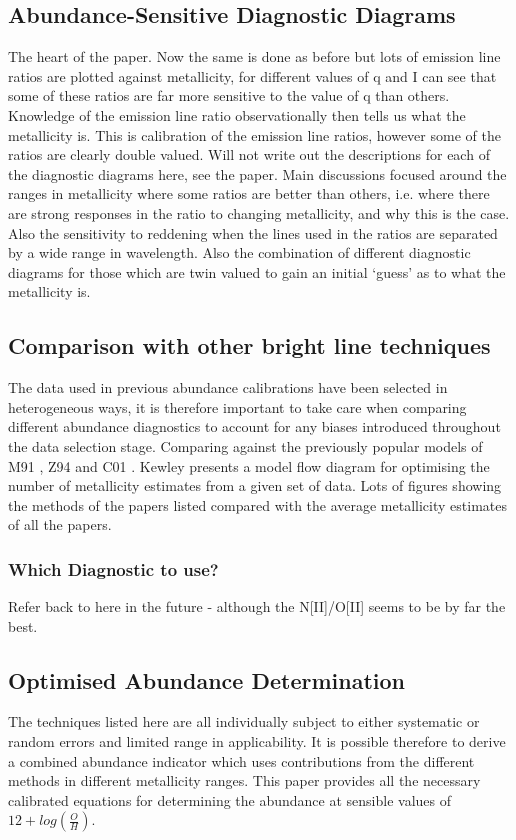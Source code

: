 \documentclass{literature}
\begin{document}
\subsection{Abundance-Sensitive Diagnostic Diagrams}
The heart of the paper. Now the same is done as before but lots of emission line ratios are plotted against metallicity, for different values of q and I can see that some of these ratios are far more sensitive to the value of q than others. Knowledge of the emission line ratio observationally then tells us what the metallicity is. This is calibration of the emission line ratios, however some of the ratios are clearly double valued. Will not write out the descriptions for each of the diagnostic diagrams here, see the paper. 
Main discussions focused around the ranges in metallicity where some ratios are better than others, i.e. where there are strong responses in the ratio to changing metallicity, and why this is the case. Also the sensitivity to reddening when the lines used in the ratios are separated by a wide range in wavelength. Also the combination of different diagnostic diagrams for those which are twin valued to gain an initial `guess' as to what the metallicity is.

\subsection{Comparison with other bright line techniques}
The data used in previous abundance calibrations have been selected in heterogeneous ways, it is therefore important to take care when comparing different abundance diagnostics to account for any biases introduced throughout the data selection stage. Comparing against the previously popular models of M91 \citep{McGaugh1991}, Z94 \citep{Zaritsky1994} and C01 \citep{Charlot2001}. Kewley presents a model flow diagram for optimising the number of metallicity estimates from a given set of data. Lots of figures showing the methods of the papers listed compared with the average metallicity estimates of all the papers.

\subsubsection{Which Diagnostic to use?} 
Refer back to here in the future - although the N[II]/O[II] seems to be by far the best.

\subsection{Optimised Abundance Determination}
The techniques listed here are all individually subject to either systematic or random errors and limited range in applicability. It is possible therefore to derive a combined abundance indicator which uses contributions from the different methods in different metallicity ranges. This paper provides all the necessary calibrated equations for determining the abundance at sensible values of $12 + log(\frac{O}{H})$. 
\end{document}
